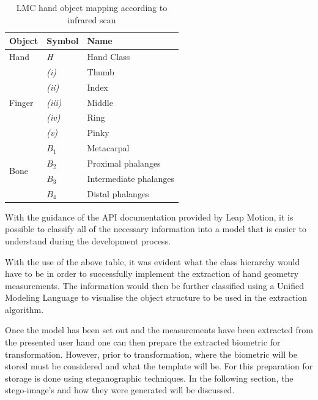 

    \begin{table}[h!]
    \caption{LMC hand object mapping according to infrared scan}
    \centering
     \begin{tabular}{|p{} | p{}| p{}|} 
     \hline
    	\textbf{Object} & \textbf{Symbol} & \textbf{Name} \\ [1ex] 
     \hline\hline 
     Hand & \textit{H} & Hand Class  \\
     \hline 
     \multirow{5}{*}{Finger} & \textit{(i)} & Thumb \\

            & \textit{(ii)} & Index     \\
     
            & \textit{(iii)} & Middle     \\
     
            & \textit{(iv)} & Ring     \\
     
            & \textit{(v)} & Pinky      \\
    \hline        
    \multirow{4}{*}{Bone} & \(B_1\) & Metacarpal\\
     
            & \(B_2\) & Proximal phalanges     \\
     
            & \(B_3\) & Intermediate phalanges     \\
     
            & \(B_4\) & Distal phalanges     \\
     \hline
     \end{tabular}
    \end{table}
    
With the guidance of the API documentation provided by Leap Motion, it is possible to classify all of the necessary information into a model that is easier to understand during the development process. 

With the use of the above table, it was evident what the class hierarchy would have to be in order to successfully implement the extraction of hand geometry measurements. The information would then be further classified using a Unified Modeling Language to visualise the object structure to be used in the extraction algorithm.

Once the model has been set out and the measurements have been extracted from the presented user hand one can then prepare the extracted biometric for transformation. However, prior to transformation, where the biometric will be stored must be considered and what the template will be. For this preparation for storage is done using steganographic techniques. In the following section, the stego-image’s and how they were generated will be discussed.

